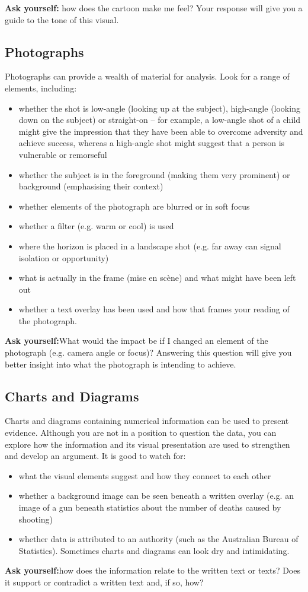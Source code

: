 \documentclass[a4paper]{article}
\begin{document}
\textbf{Ask yourself:} how does the cartoon make me feel? Your response will give you a guide to the tone of this visual.

\subsection{Photographs}
Photographs can provide a wealth of material for analysis. Look for a range of elements, including:

\begin{itemize}
\item whether the shot is low-angle (looking up at the subject), high-angle (looking down on the subject) or straight-on – for example, a low-angle shot of a child might give the impression that they have been able to overcome adversity and achieve success, whereas a high-angle shot might suggest that a person is vulnerable or remorseful
\item whether the subject is in the foreground (making them very prominent) or background (emphasising their context)
\item whether elements of the photograph are blurred or in soft focus
\item whether a filter (e.g. warm or cool) is used
\item where the horizon is placed in a landscape shot (e.g. far away can signal isolation or opportunity)
\item what is actually in the frame (mise en scène) and what might have been left out
\item whether a text overlay has been used and how that frames your reading of the photograph.
\end{itemize}

\textbf{Ask yourself:}What would the impact be if I changed an element of the photograph (e.g. camera angle or focus)? Answering this question will give you better insight into what the photograph is intending to achieve.


\subsection{Charts and Diagrams}
Charts and diagrams containing numerical information can be used to present evidence. Although you are not in a position to question the data, you can explore how the information and its visual presentation are used to strengthen and develop an argument. It is good to watch for:
\begin{itemize}
\item what the visual elements suggest and how they connect to each other
\item whether a background image can be seen beneath a written overlay (e.g. an image of a gun beneath statistics about the number of deaths caused by shooting)
\item whether data is attributed to an authority (such as the Australian Bureau of Statistics).
Sometimes charts and diagrams can look dry and intimidating.
\end{itemize}
\textbf{Ask yourself:}how does the information relate to the written text or texts? Does it support or contradict a written text and, if so, how?
\end{document}
